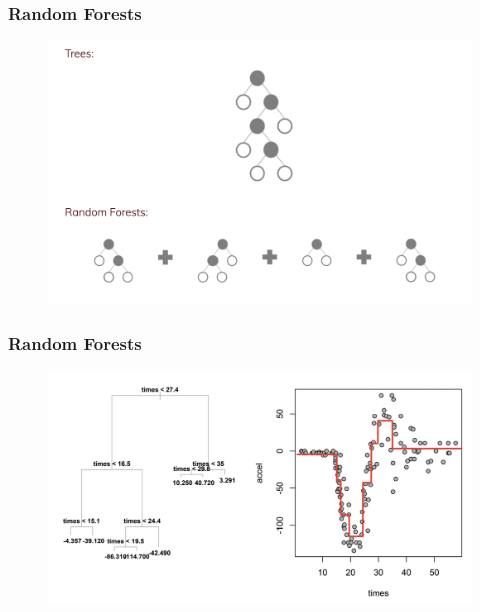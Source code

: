 \documentclass[
  shownotes,
  xcolor={svgnames},
  hyperref={colorlinks,citecolor=DarkBlue,linkcolor=DarkRed,urlcolor=DarkBlue}
  , aspectratio=169]{beamer}
\begin{document}
\begin{frame}[fragile]
\frametitle{Random Forests}

\begin{figure}[H] \centering
            \captionsetup{justification=centering}
              \includegraphics[scale=0.4]{figures/trees_to_forests.png}
 \end{figure}
\end{frame}

\begin{frame}[fragile]
\frametitle{Random Forests}

\begin{figure}[H] \centering
            \captionsetup{justification=centering}
              \includegraphics[scale=0.25]{figures/accel_1}
 \end{figure}
\end{frame}
\end{document}
